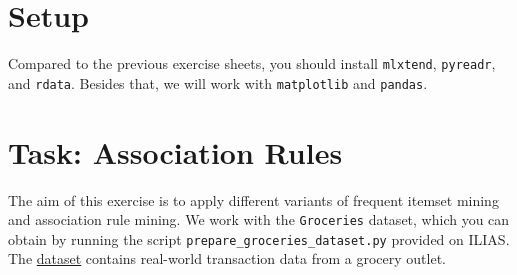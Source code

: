 \documentclass[12pt]{article}
\newcommand{\code}[1]{\textcolor{kitgreen}{\texttt{#1}}}
\begin{document}
\section*{Setup}

Compared to the previous exercise sheets, you should install \code{mlxtend}, \code{pyreadr}, and \code{rdata}.
Besides that, we will work with \code{matplotlib} and \code{pandas}.

\section*{Task: Association Rules}

The aim of this exercise is to apply different variants of frequent itemset mining and association rule mining.
We work with the \code{Groceries} dataset, which you can obtain by running the script \code{prepare\_groceries\_dataset.py} provided on ILIAS.
The \href{https://rdrr.io/cran/arules/man/Groceries.html}{dataset} contains real-world transaction data from a grocery outlet.
\end{document}
